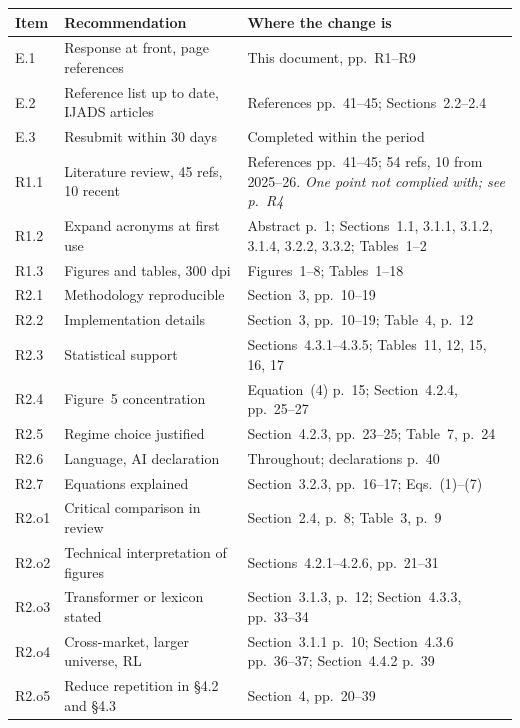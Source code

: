\documentclass[11pt,a4paper]{article}
\begin{document}
\begin{longtable}{@{}p{1.3cm}p{6.1cm}p{8.4cm}@{}}
\toprule
\textbf{Item} & \textbf{Recommendation} & \textbf{Where the change is} \\
\midrule
\endhead
E.1 & Response at front, page references & This document, pp.~R1--R9 \\
E.2 & Reference list up to date, IJADS articles & References pp.~41--45; Sections~2.2--2.4 \\
E.3 & Resubmit within 30 days & Completed within the period \\
\addlinespace
R1.1 & Literature review, 45 refs, 10 recent & References pp.~41--45; 54 refs, 10 from 2025--26. \emph{One point not complied with; see p.~R4} \\
R1.2 & Expand acronyms at first use & Abstract p.~1; Sections~1.1, 3.1.1, 3.1.2, 3.1.4, 3.2.2, 3.3.2; Tables~1--2 \\
R1.3 & Figures and tables, 300 dpi & Figures~1--8; Tables~1--18 \\
\addlinespace
R2.1 & Methodology reproducible & Section~3, pp.~10--19 \\
R2.2 & Implementation details & Section~3, pp.~10--19; Table~4, p.~12 \\
R2.3 & Statistical support & Sections~4.3.1--4.3.5; Tables~11, 12, 15, 16, 17 \\
R2.4 & Figure~5 concentration & Equation~(4) p.~15; Section~4.2.4, pp.~25--27 \\
R2.5 & Regime choice justified & Section~4.2.3, pp.~23--25; Table~7, p.~24 \\
R2.6 & Language, AI declaration & Throughout; declarations p.~40 \\
R2.7 & Equations explained & Section~3.2.3, pp.~16--17; Eqs.~(1)--(7) \\
\addlinespace
R2.o1 & Critical comparison in review & Section~2.4, p.~8; Table~3, p.~9 \\
R2.o2 & Technical interpretation of figures & Sections~4.2.1--4.2.6, pp.~21--31 \\
R2.o3 & Transformer or lexicon stated & Section~3.1.3, p.~12; Section~4.3.3, pp.~33--34 \\
R2.o4 & Cross-market, larger universe, RL & Section~3.1.1 p.~10; Section~4.3.6 pp.~36--37; Section~4.4.2 p.~39 \\
R2.o5 & Reduce repetition in \S4.2 and \S4.3 & Section~4, pp.~20--39 \\
\bottomrule
\end{longtable}
\end{document}
